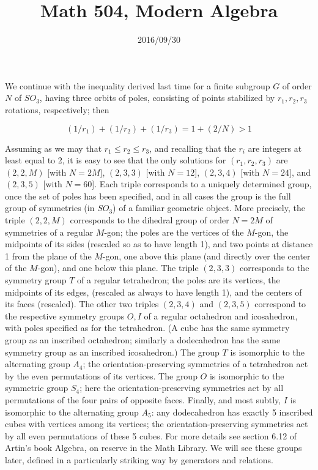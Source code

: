 \documentclass[10pt]{article}
\title{Math 504, Modern Algebra}
\date{2016/09/30}
\begin{document}
\maketitle

We continue with the inequality derived last time for a finite subgroup
$G$ of order $N$ of $SO_3$, having three orbits of poles, consisting of
points stabilized by $r_1,r_2,r_3$ rotations, respectively; then

\[
(1/r_1) + (1/r_2) + (1/r_3) = 1 + (2/N) > 1
\]

Assuming as we may that $r_1\le r_2\le r_3$, and recalling that the
$r_i$ are integers at least equal to 2, it is easy to see that the only
solutions for $(r_1,r_2,r_3)$ are $(2,2,M)$ [with $N=2M$], $(2,3,3)$
[with $N = 12$], $(2,3,4)$ [with $N = 24$], and $(2,3,5)$ [with $N =
  60$]. Each triple corresponds to a uniquely determined group, once the
set of poles has been specified, and in all cases the group is the full
group of symmetries (in $SO_3$) of a familiar geometric object. More
precisely, the triple $(2,2,M)$ corresponds to the dihedral group of
order $N = 2M$ of symmetries of a regular $M$-gon; the poles are the
vertices of the $M$-gon, the midpoints of its sides (rescaled so as to
have length 1), and two points at distance 1 from the plane of the
$M$-gon, one above this plane (and directly over the center of the
$M$-gon), and one below this plane. The triple $(2,3,3)$ corresponds to
the symmetry group $T$ of a regular tetrahedron; the poles are its
vertices, the midpoints of its edges, (rescaled as always to have length
1), and the centers of its faces (rescaled). The other two triples
$(2,3,4)$ and $(2,3,5)$ correspond to the respective symmetry groups
$O,I$ of a regular octahedron and icosahedron, with poles specified as
for the tetrahedron. (A cube has the same symmetry group as an inscribed
octahedron; similarly a dodecahedron has the same symmetry group as an
inscribed icosahedron.) The group $T$ is isomorphic to the alternating
group $A_4$; the orientation-preserving symmetries of a tetrahedron act
by the even permutations of its vertices. The group $O$ is isomorphic to
the symmetric group $S_4$; here the orientation-preserving symmetries
act by all permutations of the four pairs of opposite faces. Finally,
and most subtly, $I$ is isomorphic to the alternating group $A_5$: any
dodecahedron has exactly 5 inscribed cubes with vertices among its
vertices; the orientation-preserving symmetries act by all even
permutations of these 5 cubes. For more details see section 6.12 of
Artin's book Algebra, on reserve in the Math Library. We will see these
groups later, defined in a particularly striking way by generators and
relations.
\end{document}
